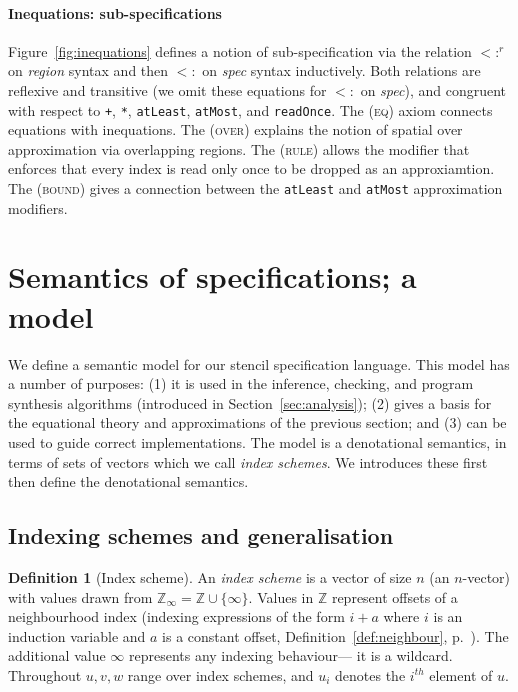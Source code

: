 \documentclass[9pt]{sigplanconf}
\newcounter{block}
\theoremstyle{definition}
\newtheorem{definition}[block]{Definition}
\newcommand{\term}[1]{\texttt{#1}}
\newcommand{\trule}[1]{\footnotesize{#1}}
\begin{document}
\paragraph{Inequations: sub-specifications}

Figure~\ref{fig:inequations} defines a notion of sub-specification
via the relation $<:^r$ on \textit{region} 
syntax and then $<:$ on \textit{spec} syntax inductively. 
Both relations are reflexive and transitive (we omit 
these equations for $<:$ on \textit{spec}), and congruent
with respect to \term{+}, \term{*}, \term{atLeast}, \term{atMost},
and \term{readOnce}. The (\trule{\textsc{eq}}) axiom connects
equations with inequations. The (\trule{\textsc{over}}) explains
the notion of spatial over approximation via overlapping regions.
The (\trule{\textsc{rule}}) allows the modifier that
enforces that every index is read only once to be dropped
as an approxiamtion. The (\trule{\textsc{bound}}) gives
a connection between the \term{atLeast} and \term{atMost}
approximation modifiers. 

\section{Semantics of specifications; a model}
\label{sec:semantics}

\newcommand{\domainVal}{\mathbb{Z}_\infty}

We define a semantic model for our stencil specification language.
This model has a number of purposes: (1) it is used in the inference,
checking, and program synthesis algorithms (introduced in
Section~\ref{sec:analysis}); (2) gives a basis for the equational
theory and approximations of the previous section; and (3) can be used
to guide correct implementations. The model is a denotational
semantics, in terms of sets of vectors which we call \emph{index
  schemes}. We introduces these first then define the denotational semantics.

\subsection{Indexing schemes and generalisation}

\begin{definition}[Index scheme]
An \emph{index scheme} is a vector of size $n$ (an $n$-vector)
with values drawn from $\domainVal = \mathbb{Z} \cup \{\infty\}$. 
Values in $\mathbb{Z}$ represent offsets 
of a neighbourhood index (indexing
expressions of the form $i + a$ where $i$ is an induction variable
and $a$ is a constant offset, Definition~\ref{def:neighbour},
p.~\pageref{def:neighbour}). The additional value
$\infty$ represents any indexing behaviour--- it is a 
wildcard.
Throughout $u, v, w$ range over index schemes, and $u_i$ denotes
the $i^{th}$ element of $u$. 
\end{definition}
\end{document}
